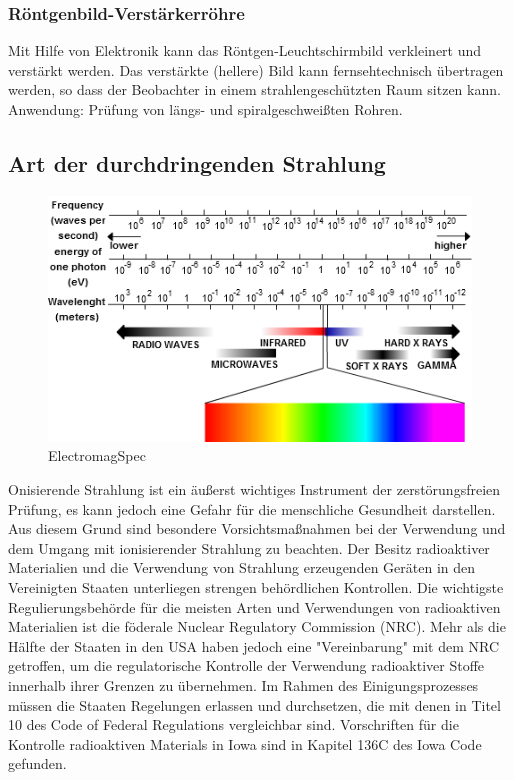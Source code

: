 \subsubsection{Röntgenbild-Verstärkerröhre}
Mit Hilfe von Elektronik kann das Röntgen-Leuchtschirmbild verkleinert und verstärkt werden. Das verstärkte (hellere) Bild kann fernsehtechnisch übertragen werden, so dass der Beobachter in einem strahlengeschützten Raum sitzen kann.
Anwendung: Prüfung von längs- und spiralgeschweißten Rohren.\\
\subsection{Art der durchdringenden Strahlung}
\begin{figure}[htb]
  \centering  
  \includegraphics[scale=0.7]{img/ElectromagSpec.png}
  \caption{ElectromagSpec}
  \label{fig:ElectromagSpec}
\end{figure}
Onisierende Strahlung ist ein äußerst wichtiges Instrument der zerstörungsfreien Prüfung, es kann jedoch eine Gefahr für die menschliche Gesundheit darstellen. Aus diesem Grund sind besondere Vorsichtsmaßnahmen bei der Verwendung und dem Umgang mit ionisierender Strahlung zu beachten. Der Besitz radioaktiver Materialien und die Verwendung von Strahlung erzeugenden Geräten in den Vereinigten Staaten unterliegen strengen behördlichen Kontrollen. Die wichtigste Regulierungsbehörde für die meisten Arten und Verwendungen von radioaktiven Materialien ist die föderale Nuclear Regulatory Commission (NRC). Mehr als die Hälfte der Staaten in den USA haben jedoch eine "Vereinbarung" mit dem NRC getroffen, um die regulatorische Kontrolle der Verwendung radioaktiver Stoffe innerhalb ihrer Grenzen zu übernehmen. Im Rahmen des Einigungsprozesses müssen die Staaten Regelungen erlassen und durchsetzen, die mit denen in Titel 10 des Code of Federal Regulations vergleichbar sind. Vorschriften für die Kontrolle radioaktiven Materials in Iowa sind in Kapitel 136C des Iowa Code gefunden.
